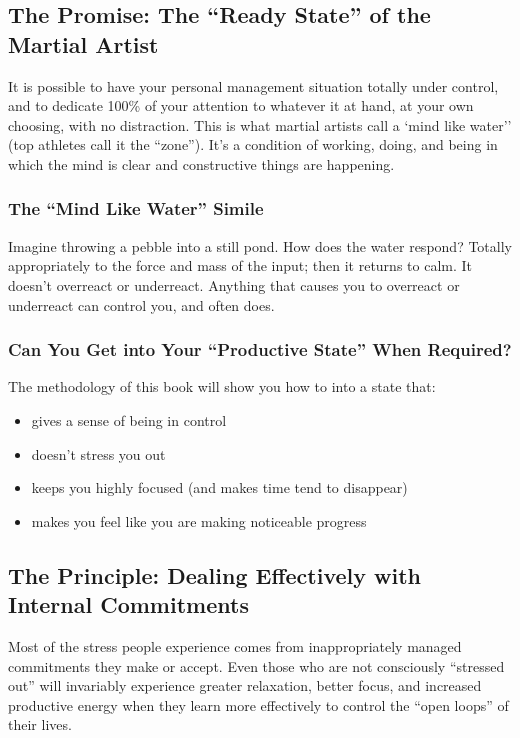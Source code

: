 \documentclass[letterpaper]{article}
\begin{document}
\subsection{The Promise: The ``Ready State'' of the Martial Artist}
It is possible to have your personal management situation totally under control, and to dedicate 100\% of your attention to whatever it at hand, at your own choosing, with no distraction. This is what martial artists call a `mind like water'' (top athletes call it the ``zone''). It's a condition of working, doing, and being in which the mind is clear and constructive things are happening.

\subsubsection*{The ``Mind Like Water'' Simile}
Imagine throwing a pebble into a still pond. How does the water respond? Totally appropriately to the force and mass of the input; then it returns to calm. It doesn't overreact or underreact. Anything that causes you to overreact or underreact can control you, and often does.

\subsubsection*{Can You Get into Your ``Productive State'' When Required?}
The methodology of this book will show you how to into a state that:
\begin{itemize}
\item gives a sense of being in control
\item doesn't stress you out
\item keeps you highly focused (and makes time tend to disappear)
\item makes you feel like you are making noticeable progress
\end{itemize}

\subsection{The Principle: Dealing Effectively with Internal Commitments}
Most of the stress people experience comes from inappropriately managed commitments they make or accept. Even those who are not consciously ``stressed out'' will invariably experience greater relaxation, better focus, and increased productive energy when they learn more effectively to control the ``open loops'' of their lives.
\end{document}
